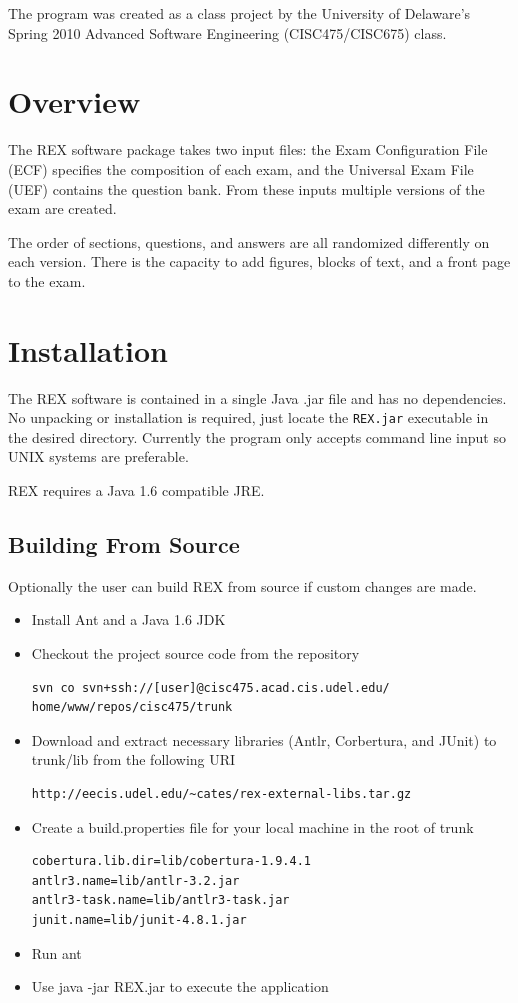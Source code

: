 \documentclass{article}
\begin{document}
The program was created as a class project by the University of Delaware's 
Spring 2010 Advanced Software Engineering (CISC475/CISC675) class.  

\section{Overview}
The REX software package takes two input files: the Exam Configuration File
(ECF) specifies the composition of each exam, and the Universal Exam File
(UEF) contains the question bank. From these inputs multiple versions of the
exam are created. 

The order of sections, questions, and answers are all randomized differently on each version. There is the capacity to add figures,
blocks of text, and a front page to the exam. 


\section{Installation}
The REX software is contained in a single Java .jar file and has no
dependencies. No unpacking or installation is required, just locate the
\texttt{REX.jar} executable in the desired directory. Currently the program
only accepts command line input so UNIX systems are preferable. 

REX requires a Java 1.6 compatible JRE. 

\subsection{Building From Source}
Optionally the user can build REX from source if custom changes are made. 
\begin{itemize}
\item Install Ant and a Java 1.6 JDK
\item Checkout the project source code from the repository
\begin{verbatim}
svn co svn+ssh://[user]@cisc475.acad.cis.udel.edu/
home/www/repos/cisc475/trunk
\end{verbatim}
\item Download and extract necessary libraries (Antlr, Corbertura, and JUnit) to
trunk/lib from the following URI
\begin{verbatim}
http://eecis.udel.edu/~cates/rex-external-libs.tar.gz
\end{verbatim}
\item Create a build.properties file for your local machine in the root of trunk
\begin{verbatim}
cobertura.lib.dir=lib/cobertura-1.9.4.1
antlr3.name=lib/antlr-3.2.jar
antlr3-task.name=lib/antlr3-task.jar
junit.name=lib/junit-4.8.1.jar
\end{verbatim}
\item Run ant
\item Use java -jar REX.jar to execute the application
\end{itemize}
\end{document}
